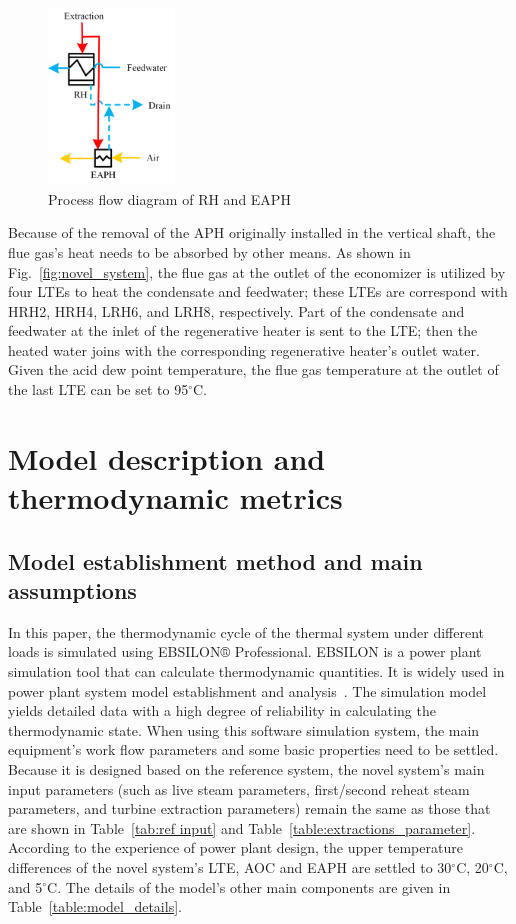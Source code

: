 \documentclass[preprint,12pt]{elsarticle}
\begin{document}
\begin{figure}[htbp]
\centering
\includegraphics[width=0.3\textwidth]{fig/extracion_heat_APH.png}
\caption{Process flow diagram of RH and EAPH} 
\label{fig:extraction_heat_APH}
\end{figure}

Because of the removal of the APH originally installed in the vertical shaft, the flue gas's heat needs to be absorbed by other means.
As shown in Fig.~\ref{fig:novel_system}, the flue gas at the outlet of the economizer is utilized by four LTEs to heat the condensate and feedwater; these LTEs are correspond with HRH2, HRH4, LRH6, and LRH8, respectively. 
Part of the condensate and feedwater at the inlet of the regenerative heater is sent to the LTE; then the heated water joins with the corresponding regenerative heater's outlet water. 
Given the acid dew point temperature, the flue gas temperature at the outlet of the last LTE can be set to 95$^\circ$C. 

\section{Model description and thermodynamic metrics}
\label{ssub:model_establishment_and_system_analysis_method}

\subsection{Model establishment method and main assumptions}
\label{ssub3:modle description}

In this paper, the thermodynamic cycle of the thermal system under different loads is simulated using EBSILON® Professional.
EBSILON is a power plant simulation tool that can calculate thermodynamic quantities. It is widely used in power plant system model establishment and analysis~\cite{Li2015Integrated,Yao2017Multi}. 
The simulation model yields detailed data with a high degree of reliability in calculating the thermodynamic state.
When using this software simulation system, the main equipment's work flow parameters and some basic properties need to be settled.
Because it is designed based on the reference system, the novel system's main input parameters (such as live steam parameters, first/second reheat steam parameters, and turbine extraction parameters) remain the same as those that are shown in Table~\ref{tab:ref input} and Table~\ref{table:extractions_parameter}.
According to the experience of power plant design, the upper temperature differences of the novel system's LTE, AOC and EAPH are settled to 30$^\circ$C, 20$^\circ$C, and 5$^\circ$C. 
The details of the model's other main components are given in Table~\ref{table:model_details}. 
\end{document}
